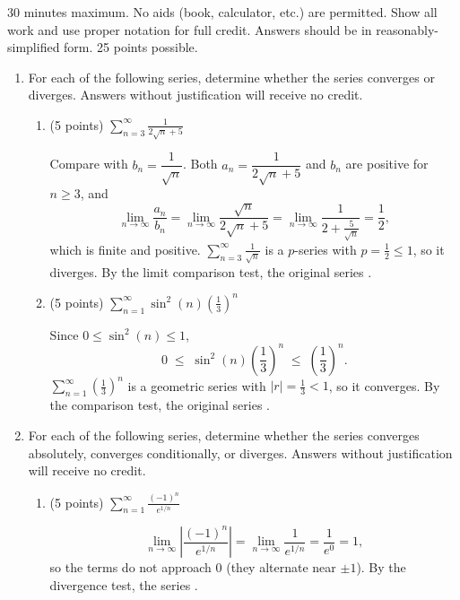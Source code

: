 \documentclass[12pt]{article}
\newcommand{\ds}{\displaystyle}
\begin{document}
30 minutes maximum.  No aids (book, calculator, etc.) are permitted.
Show all work and use proper notation for full credit.  Answers should
be in reasonably-simplified form.  25 points possible.

\begin{enumerate}

\item For each of the following series, determine whether the series
  converges or diverges. Answers without justification will receive no
  credit.

  \begin{enumerate}
  \item (5 points) $\ds \sum_{n=3}^{\infty} \frac{1}{2\sqrt{n}+5}$
    \begin{solution}
      Compare with $b_n = \dfrac{1}{\sqrt{n}}$. Both $a_n = \dfrac{1}{2\sqrt{n}+5}$ and $b_n$ are
      positive for $n \ge 3$, and
      \[
        \lim_{n\to\infty} \frac{a_n}{b_n} = \lim_{n\to\infty} \frac{\sqrt{n}}{2\sqrt{n}+5}
        = \lim_{n\to\infty} \frac{1}{2 + \frac{5}{\sqrt{n}}} = \frac12,
      \]
      which is finite and positive. $\ds\sum_{n=3}^\infty \frac{1}{\sqrt{n}}$ is a $p$-series with
      $p = \frac12 \le 1$, so it diverges. By the limit comparison test, the original series
      .
    \end{solution}
    \vfill

  \item (5 points) $\ds \sum_{n=1}^{\infty} \sin^2(n) \left( \frac{1}{3} \right)^n$
    \begin{solution}
      Since $0 \le \sin^2(n) \le 1$,
      \[
        0 \;\le\; \sin^2(n) \left( \frac13 \right)^n \;\le\; \left( \frac13 \right)^n.
      \]
      $\ds\sum_{n=1}^\infty \left( \frac13 \right)^n$ is a geometric series with
      $|r| = \frac13 < 1$, so it converges. By the comparison test, the original series
      .
    \end{solution}
    \vfill

  \end{enumerate}

  \newpage
  
\item For each of the following series, determine whether the series
  converges absolutely, converges conditionally, or diverges. Answers
  without justification will receive no credit.

  \begin{enumerate}
  \item (5 points) $\ds \sum_{n=1}^{\infty} \frac{(-1)^n}{e^{1/n}}$
    \begin{solution}
      \[
        \lim_{n\to\infty} \left| \frac{(-1)^n}{e^{1/n}} \right| = \lim_{n\to\infty} \frac{1}{e^{1/n}}
        = \frac{1}{e^0} = 1,
      \]
      so the terms do not approach $0$ (they alternate near $\pm 1$). By the divergence test,
      the series .
    \end{solution}
    \vfill


\end{enumerate}
\end{enumerate}
\end{document}
